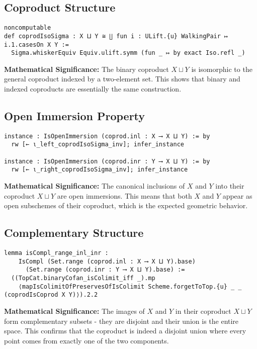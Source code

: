 \documentclass{article}
\theoremstyle{definition}
\begin{document}
\subsection{Coproduct Structure}

\begin{lstlisting}
noncomputable
def coprodIsoSigma : X ⨿ Y ≅ ∐ fun i : ULift.{u} WalkingPair ↦ i.1.casesOn X Y :=
  Sigma.whiskerEquiv Equiv.ulift.symm (fun _ ↦ by exact Iso.refl _)
\end{lstlisting}

\textbf{Mathematical Significance:} The binary coproduct $X \sqcup Y$ is isomorphic to the general coproduct indexed by a two-element set. This shows that binary and indexed coproducts are essentially the same construction.

\subsection{Open Immersion Property}

\begin{lstlisting}
instance : IsOpenImmersion (coprod.inl : X ⟶ X ⨿ Y) := by
  rw [← ι_left_coprodIsoSigma_inv]; infer_instance

instance : IsOpenImmersion (coprod.inr : Y ⟶ X ⨿ Y) := by
  rw [← ι_right_coprodIsoSigma_inv]; infer_instance
\end{lstlisting}

\textbf{Mathematical Significance:} The canonical inclusions of $X$ and $Y$ into their coproduct $X \sqcup Y$ are open immersions. This means that both $X$ and $Y$ appear as open subschemes of their coproduct, which is the expected geometric behavior.

\subsection{Complementary Structure}

\begin{lstlisting}
lemma isCompl_range_inl_inr :
    IsCompl (Set.range (coprod.inl : X ⟶ X ⨿ Y).base)
      (Set.range (coprod.inr : Y ⟶ X ⨿ Y).base) :=
  ((TopCat.binaryCofan_isColimit_iff _).mp
    ⟨mapIsColimitOfPreservesOfIsColimit Scheme.forgetToTop.{u} _ _ (coprodIsCoprod X Y)⟩).2.2
\end{lstlisting}

\textbf{Mathematical Significance:} The images of $X$ and $Y$ in their coproduct $X \sqcup Y$ form complementary subsets - they are disjoint and their union is the entire space. This confirms that the coproduct is indeed a disjoint union where every point comes from exactly one of the two components.
\end{document}
